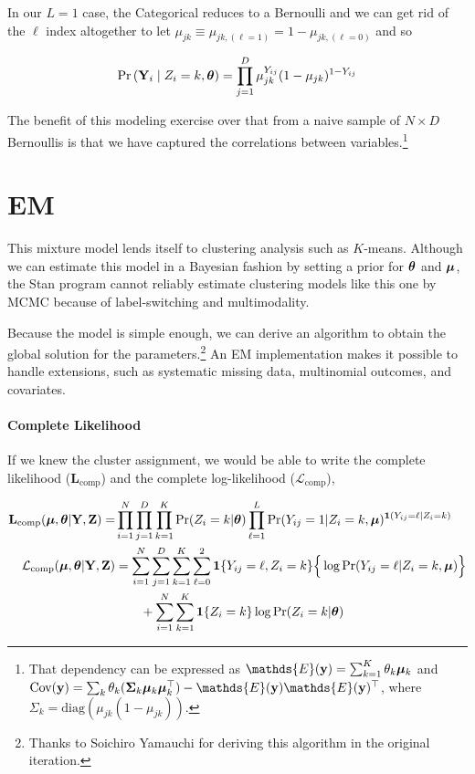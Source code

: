 \documentclass[11pt]{article}
\begin{document}
In our \(L = 1\) case, the Categorical reduces to a Bernoulli and we can get rid of the \(\ell\) index altogether to let  \(\mu_{jk} \equiv \mu_{jk,(\ell=1)} = 1 - \mu_{jk,(\ell=0)}\) and so

\begin{align}
\mathbb{\Pr}\left(\mathbf{Y}_{i} \mid Z_{i} = k, \bm{\theta}\right) = \prod^{D}_{j=1}\mu_{jk}^{Y_{ij}}(1 - \mu_{jk})^{1- Y_{ij}}
\end{align}




The benefit of this modeling exercise over that from a naive sample of
\(N \times D\) Bernoullis is that we have captured the correlations
between variables.\footnote{That dependency can be expressed as \(\mathds{E}(\by) = \sum_{k = 1}^{K} \theta_{k} \bmu_{k}\) and 
\(\cov({\by}) = \sum_{k} \theta_{k} (\mathbf{\Sigma}_k \bmu_k\bmu_{k}^{\top}) - \mathds{E}(\by)\mathds{E}(\by)^\top\), where \(\Sigma_k = \text{diag}(\mu_{jk}(1 - \mu_{jk}))\).}


\section{EM}

This mixture model lends itself to clustering analysis such as \(K\)-means. Although we can estimate this model in a Bayesian fashion by setting a prior for \(\bm{\theta}\) and \(\bm{\mu}\), the \textsf{Stan} program cannot reliably estimate clustering models like this one by MCMC because of label-switching and multimodality. 

Because the model is simple enough, we can derive an algorithm to obtain the global solution for the parameters.\footnote{Thanks to Soichiro Yamauchi for deriving this algorithm in the original iteration.} An EM implementation makes it possible to handle extensions, such as systematic missing data, multinomial outcomes, and covariates. 

\paragraph{Complete Likelihood} If we knew the cluster assignment, we would be able to write the complete likelihood (\(\mathbf{L}_{\text{comp}}\)) and the complete log-likelihood (\(\mathcal{L}_{\text{comp}}\)),


\begin{align}
\mathbf{L}_{\text{comp}}(\bm{\mu}, \bm{\theta} | \mathbf{Y}, \mathbf{Z}) =& \prod^{N}_{i=1}\prod^{D}_{j=1} \prod^{K}_{k = 1}\Pr(Z_i = k | \bm{\theta})  \prod^L_{\ell = 1}\Pr(Y_{ij}=  1 | Z_i = k, \bm{\mu})^{\bm{1}(Y_{ij} = \ell \mid Z_i = k)}\nonumber\\
\mathcal{L}_{\text{comp}}(\bm{\mu}, \bm{\theta}|\mathbf{Y}, \mathbf{Z})
& = \sum^{N}_{i=1}\sum^{D}_{j=1}\sum^{K}_{k=1}\sum^{2}_{\ell = 0}
\bm{1}\{Y_{ij} = \ell, Z_{i} = k\}\Big\{
\log \Pr(Y_{ij} = \ell | Z_{i} = k, \bm{\mu})
\Big\} \nonumber\\
& \qquad +
\sum^N_{i=1}\sum^{K}_{k=1}\bm{1}\{Z_{i} = k\}\log \Pr(Z_{i} = k | \bm{\theta})
\end{align}
\end{document}
